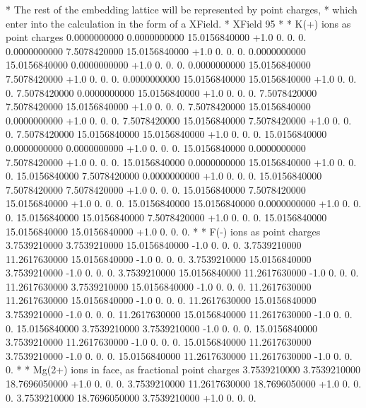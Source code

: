 \begin{inputlisting}
* The rest of the embedding lattice will be represented by point charges,
* which enter into the calculation in the form of a XField.
*
XField
 95
*
* K(+) ions as point charges
    0.0000000000   0.0000000000  15.0156840000       +1.0  0.  0.  0.
    0.0000000000   7.5078420000  15.0156840000       +1.0  0.  0.  0.
    0.0000000000  15.0156840000   0.0000000000       +1.0  0.  0.  0.
    0.0000000000  15.0156840000   7.5078420000       +1.0  0.  0.  0.
    0.0000000000  15.0156840000  15.0156840000       +1.0  0.  0.  0.
    7.5078420000   0.0000000000  15.0156840000       +1.0  0.  0.  0.
    7.5078420000   7.5078420000  15.0156840000       +1.0  0.  0.  0.
    7.5078420000  15.0156840000   0.0000000000       +1.0  0.  0.  0.
    7.5078420000  15.0156840000   7.5078420000       +1.0  0.  0.  0.
    7.5078420000  15.0156840000  15.0156840000       +1.0  0.  0.  0.
   15.0156840000   0.0000000000   0.0000000000       +1.0  0.  0.  0.
   15.0156840000   0.0000000000   7.5078420000       +1.0  0.  0.  0.
   15.0156840000   0.0000000000  15.0156840000       +1.0  0.  0.  0.
   15.0156840000   7.5078420000   0.0000000000       +1.0  0.  0.  0.
   15.0156840000   7.5078420000   7.5078420000       +1.0  0.  0.  0.
   15.0156840000   7.5078420000  15.0156840000       +1.0  0.  0.  0.
   15.0156840000  15.0156840000   0.0000000000       +1.0  0.  0.  0.
   15.0156840000  15.0156840000   7.5078420000       +1.0  0.  0.  0.
   15.0156840000  15.0156840000  15.0156840000       +1.0  0.  0.  0.
*
* F(-) ions as point charges
   3.7539210000   3.7539210000  15.0156840000       -1.0  0.  0.  0.
   3.7539210000  11.2617630000  15.0156840000       -1.0  0.  0.  0.
   3.7539210000  15.0156840000   3.7539210000       -1.0  0.  0.  0.
   3.7539210000  15.0156840000  11.2617630000       -1.0  0.  0.  0.
  11.2617630000   3.7539210000  15.0156840000       -1.0  0.  0.  0.
  11.2617630000  11.2617630000  15.0156840000       -1.0  0.  0.  0.
  11.2617630000  15.0156840000   3.7539210000       -1.0  0.  0.  0.
  11.2617630000  15.0156840000  11.2617630000       -1.0  0.  0.  0.
  15.0156840000   3.7539210000   3.7539210000       -1.0  0.  0.  0.
   15.0156840000   3.7539210000  11.2617630000       -1.0  0.  0.  0.
   15.0156840000  11.2617630000   3.7539210000       -1.0  0.  0.  0.
   15.0156840000  11.2617630000  11.2617630000       -1.0  0.  0.  0.
*
* Mg(2+) ions in face, as fractional point charges
   3.7539210000   3.7539210000  18.7696050000        +1.0  0.  0.  0.
   3.7539210000  11.2617630000  18.7696050000        +1.0  0.  0.  0.
   3.7539210000  18.7696050000   3.7539210000        +1.0  0.  0.  0.

\end{inputlisting}
